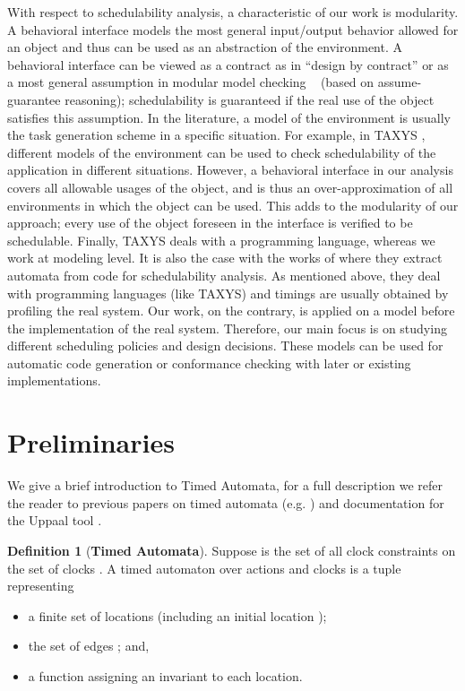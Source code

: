 \documentclass[copyright,creativecommons]{eptcs}
\theoremstyle{definition}
\newtheorem{definition}{Definition}
\newcommand{\Uppaal}{{\sc Uppaal}\xspace}
\begin{document}
With respect to schedulability analysis, a characteristic of our work is modularity. A behavioral interface models the most general input/output behavior allowed for an object and thus can be used as an abstraction of the environment. A behavioral interface can be viewed as a contract as in ``design by contract'' \cite{Meyer92} or as a most general assumption in modular model checking ~\cite{KupfermanVW01} (based on assume-guarantee reasoning); schedulability is guaranteed if the real use of the object satisfies this assumption.
In the literature,
a model of the environment is usually the task generation scheme in a specific situation. For example, in TAXYS \cite{ClossePPSVWY01}, different models of the environment can be used to check schedulability of the application in different situations. However, a behavioral interface in our analysis
covers all allowable usages of the object, and is thus an over-approximation of all environments in which the object can be used.
This adds to the modularity of our approach; every use of the object foreseen in the interface is verified to be schedulable.
Finally, TAXYS deals with a programming language, whereas we work at modeling level. It is also the case with the works of \cite{KloukinasY03} where they extract automata from code for schedulability analysis. As mentioned above, they deal with programming languages (like TAXYS) and timings are usually obtained by profiling the real system. Our work, on the contrary, is applied on a model before the implementation of the real system. Therefore, our main focus is on studying different scheduling policies and design decisions.
These models can be used for automatic code generation or conformance checking with later or existing implementations.



\section{Preliminaries}
\label{sec:prelim}

We give a brief introduction to Timed Automata, for a full description we refer the reader to previous papers on timed automata (e.g. \cite{AlurD94}) and documentation for the \Uppaal tool \cite{LarsenPY97}.

\begin{definition}[\bf Timed Automata]\label{def:timeAut}
Suppose  is the set of all clock constraints on the set of clocks . A timed automaton over actions  and clocks  is a tuple  representing
\begin{itemize}
\item a finite set of locations  (including an initial location );
\item the set of edges ; and,
\item a function  assigning an invariant to each location.
\end{itemize}
\end{definition}
\end{document}
